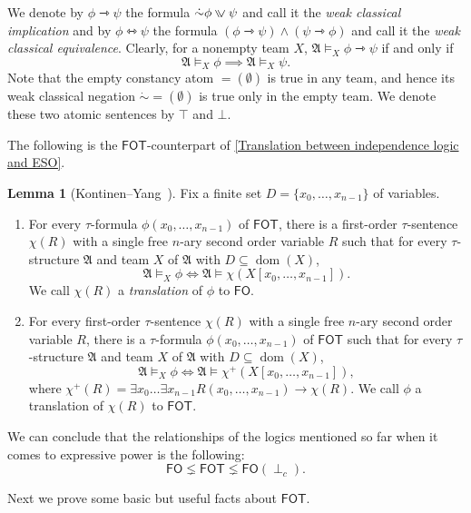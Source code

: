 \documentclass[a4paper]{amsart}
\theoremstyle{definition}
\newtheorem{lemma}[definition]{Lemma}
\theoremstyle{remark}
\newcommand{\A}{\mathcal{A}}
\DeclareMathOperator{\dep}{\mathop{=}}
\DeclareMathOperator{\dom}{dom}
\newcommand\ivee{\mathrel{\rotatebox[origin=c]{270}{$\geqslant$}}}
\newcommand{\cneg}{\mathord{\dot{\sim}}}
\newcommand\fol{\mathsf{FO}}
\newcommand\fot{\mathsf{FOT}}
\newcommand\foil{\mathsf{FO}(\perp_c)}
\theoremstyle{definition}
\renewcommand{\A}{\mathfrak{A}}
\newcommand{\wcimp}{\rightarrowtriangle}
\newcommand{\wcequiv}{\leftrightarrowtriangle}
\begin{document}
We denote by $\phi\wcimp\psi$ the formula $\cneg\phi\ivee\psi$ and call it the \emph{weak classical implication} and by $\phi\wcequiv\psi$ the formula $(\phi\wcimp\psi)\land(\psi\wcimp\phi)$ and call it the \emph{weak classical equivalence}. Clearly, for a nonempty team $X$, $\A\models_X \phi\wcimp\psi$ if and only if
\[
    \A\models_X \phi \implies \A\models_X \psi.
\]
Note that the empty constancy atom $\dep(\emptyset)$ is true in any team, and hence its weak classical negation $\cneg\dep(\emptyset)$ is true only in the empty team. We denote these two atomic sentences by $\top$ and $\bot$.

The following is the $\fot$-counterpart of \cref{Translation between independence logic and ESO}.

\begin{lemma}[Kontinen--Yang~\cite{MR4594292}]\label{Translation between FOT and FO}
    Fix a finite set $D = \{x_0,\dots,x_{n-1}\}$ of variables.
    \begin{enumerate}
        \item For every $\tau$-formula $\phi(x_0,\dots,x_{n-1})$ of $\fot$, there is a first-order $\tau$-sentence $\chi(R)$ with a single free $n$-ary second order variable $R$ such that for every $\tau$-structure $\A$ and team $X$ of $\A$ with $D\subseteq\dom(X)$,
        \[
            \A\models_X\phi \iff \A\models\chi(X[x_0,\dots,x_{n-1}]).
        \]
        We call $\chi(R)$ a \emph{translation} of $\phi$ to $\fol$.

        \item For every first-order $\tau$-sentence $\chi(R)$ with a single free $n$-ary second order variable $R$, there is a $\tau$-formula $\phi(x_0,\dots,x_{n-1})$ of $\fot$ such that for every $\tau$-structure $\A$ and team $X$ of $\A$ with $D\subseteq\dom(X)$,
        \[
            \A\models_X\phi \iff \A\models\chi^+(X[x_0,\dots,x_{n-1}]),
        \]
        where $\chi^+(R) = \exists x_0\dots\exists x_{n-1} R(x_0,\dots,x_{n-1})\to\chi(R)$. We call $\phi$ a translation of $\chi(R)$ to $\fot$.
    \end{enumerate}
\end{lemma}

We can conclude that the relationships of the logics mentioned so far when it comes to expressive power is the following:
\[
    \fol \lneq \fot \lneq \foil.
\]


Next we prove some basic but useful facts about $\fot$.
\end{document}
